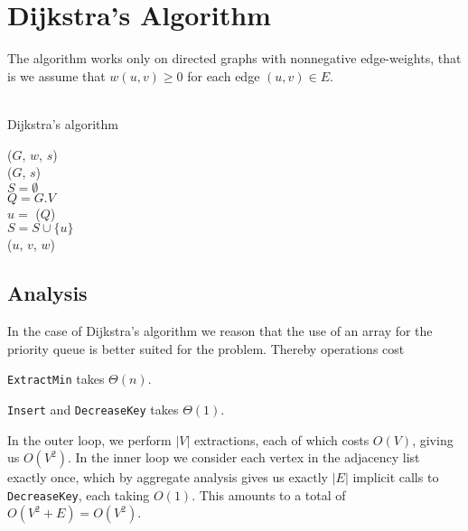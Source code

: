 \section{Dijkstra's Algorithm}
The algorithm works only on directed graphs with nonnegative edge-weights,
that is we assume that $w(u, v) \geq 0$ for each edge $(u, v) \in E$.
\\\\
\begin{algorithm}[H]
	\caption{Dijkstra's algorithm}
	\label{alg:dijkstra}
	
	
	
	
	\BlankLine
	\Dijkstra($G$, $w$, $s$) \\
	\Begin
	{
		\InitSingleSource($G$, $s$) \\
		$S = \emptyset$ \\
		$Q = G.V$ \\
		{
			$u = $ \ExtractMin($Q$) \\
			$S = S \cup \{u\}$ \\
			{
				\Relax($u$, $v$, $w$)
			}
		}
	}
\end{algorithm}

\subsection{Analysis}
In the case of Dijkstra's algorithm we reason that the use of an array for the
priority queue is better suited for the problem. Thereby operations cost
\begin{description}
	\item \texttt{ExtractMin} takes $\Theta(n)$.
	\item \texttt{Insert} and \texttt{DecreaseKey} takes $\Theta(1)$.
\end{description}
In the outer loop, we perform $|V|$ extractions, each of which costs $O(V)$,
giving us $O(V^2)$. In the inner loop we consider each vertex in the adjacency
list exactly once, which by aggregate analysis gives us exactly $|E|$ implicit
calls to \texttt{DecreaseKey}, each taking $O(1)$. This amounts to a total of
$O(V^2 + E) = O(V^2)$.

